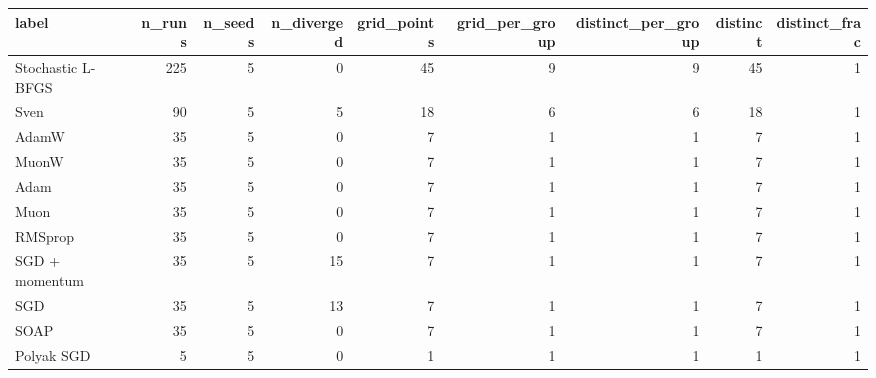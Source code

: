 \begin{tabular}{lrrrrrrrr}
\toprule
label & n\_runs & n\_seeds & n\_diverged & grid\_points & grid\_per\_group & distinct\_per\_group & distinct & distinct\_frac \\
\midrule
Stochastic L-BFGS & 225 & 5 & 0 & 45 & 9 & 9 & 45 & 1 \\
Sven & 90 & 5 & 5 & 18 & 6 & 6 & 18 & 1 \\
AdamW & 35 & 5 & 0 & 7 & 1 & 1 & 7 & 1 \\
MuonW & 35 & 5 & 0 & 7 & 1 & 1 & 7 & 1 \\
Adam & 35 & 5 & 0 & 7 & 1 & 1 & 7 & 1 \\
Muon & 35 & 5 & 0 & 7 & 1 & 1 & 7 & 1 \\
RMSprop & 35 & 5 & 0 & 7 & 1 & 1 & 7 & 1 \\
SGD + momentum & 35 & 5 & 15 & 7 & 1 & 1 & 7 & 1 \\
SGD & 35 & 5 & 13 & 7 & 1 & 1 & 7 & 1 \\
SOAP & 35 & 5 & 0 & 7 & 1 & 1 & 7 & 1 \\
Polyak SGD & 5 & 5 & 0 & 1 & 1 & 1 & 1 & 1 \\
\bottomrule
\end{tabular}
